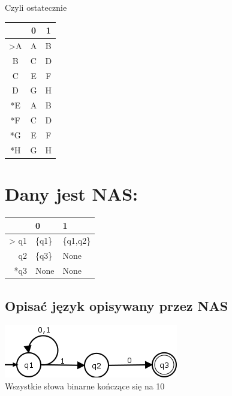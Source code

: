 \documentclass[a4paper,11pt]{article}
\begin{document}
\begin{center}
	Czyli ostatecznie \\
	\begin{tabular}{|c|c|c|}
		\hline
		   & 0 & 1 \\ \hline
		>A & A & B \\ \hline
		B  & C & D \\ \hline
		C  & E & F \\ \hline
		D  & G & H \\ \hline
		*E & A & B \\ \hline
		*F & C & D \\ \hline
		*G & E & F \\ \hline
		*H & G & H \\ \hline
	\end{tabular}
\end{center}

\newpage
\section{Dany jest NAS:}
\begin{center}
	\begin{tabular}{rcc}
		\hline
		\multicolumn{1}{|r|}{}     & \multicolumn{1}{l|}{0}      & \multicolumn{1}{l|}{1}         \\ \hline
		\multicolumn{1}{|r|}{> q1} & \multicolumn{1}{l|}{\{q1\}} & \multicolumn{1}{l|}{\{q1,q2\}} \\ \hline
		\multicolumn{1}{|r|}{q2}   & \multicolumn{1}{l|}{\{q3\}} & \multicolumn{1}{l|}{None}      \\ \hline
		\multicolumn{1}{|r|}{*q3}  & \multicolumn{1}{l|}{None}   & \multicolumn{1}{l|}{None}      \\ \hline
	\end{tabular}
\end{center}
\subsection{Opisać język opisywany przez NAS}
\begin{center}
	\includegraphics{nas2} \\
	Wszystkie słowa binarne kończące się na 10
\end{center}
\end{document}
